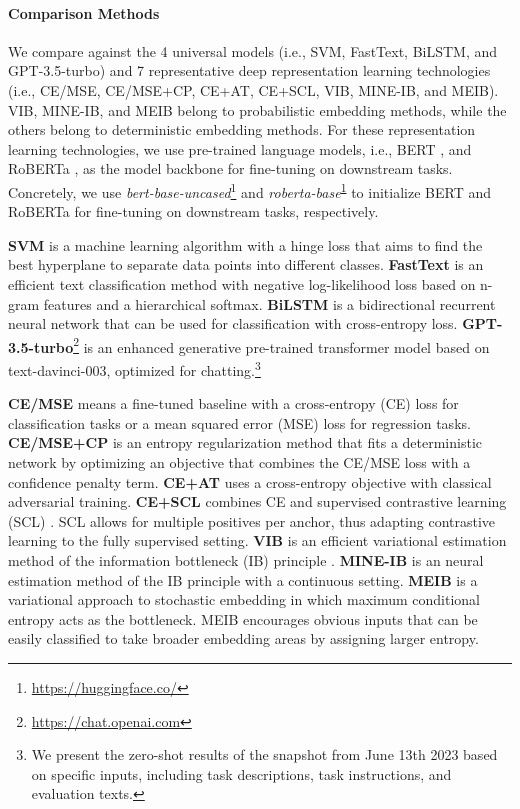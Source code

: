 \documentclass[letterpaper]{article} %
\begin{document}
\paragraph{Comparison Methods}
We compare against the 4 universal models (i.e., SVM, FastText, BiLSTM, and GPT-3.5-turbo) and 7 representative deep representation learning technologies (i.e., 
CE/MSE, CE/MSE+CP, CE+AT, CE+SCL, VIB, MINE-IB, and MEIB). 
VIB, MINE-IB, and MEIB belong to probabilistic embedding methods, while the others belong to deterministic embedding methods.
For these representation learning technologies, we use pre-trained language models, i.e., BERT \cite{DBLP:conf/naacl/DevlinCLT19}, and RoBERTa \cite{DBLP:journals/corr/abs-1907-11692}, as the model backbone for fine-tuning on downstream tasks.
Concretely, we use \textit{bert-base-uncased}\footnote{\url{https://huggingface.co/}\label{code}} and \textit{roberta-base}\textsuperscript{\ref{code}} to initialize BERT and RoBERTa for fine-tuning on downstream tasks, respectively.


\textbf{SVM} \cite{cortes1995support} is a machine learning algorithm with a hinge loss that aims to find the best hyperplane to separate data points into different classes.
\textbf{FastText} \cite{joulin2017bag} is an efficient text classification method with negative log-likelihood loss based on n-gram features and a hierarchical softmax.
\textbf{BiLSTM} is a bidirectional recurrent neural network \cite{hochreiter1997long} that can be used for classification with cross-entropy loss.
\textbf{GPT-3.5-turbo}\footnote{\url{https://chat.openai.com}} is an enhanced generative pre-trained transformer model based on text-davinci-003, optimized for chatting.\footnote{We present the zero-shot results of the snapshot from June 13th 2023 based on specific inputs, including task descriptions, task instructions, and evaluation texts.}


\textbf{CE/MSE} means a fine-tuned baseline with a cross-entropy (CE) loss for classification tasks or a mean squared error (MSE) loss for regression tasks.
\textbf{CE/MSE+CP} \cite{DBLP:conf/iclr/PereyraTCKH17} is an entropy regularization method that fits a deterministic network by optimizing an objective that combines the CE/MSE loss with a confidence penalty term. 
\textbf{CE+AT} \citep{DBLP:conf/iclr/MiyatoDG17} uses a cross-entropy objective with classical adversarial training.
\textbf{CE+SCL} \cite{gunel2020supervised} combines CE and supervised contrastive learning (SCL) \cite{khosla2020supervised}.
SCL allows for multiple positives per anchor, thus adapting contrastive learning to the fully supervised setting.
\textbf{VIB} \cite{DBLP:conf/iclr/AlemiFD017,DBLP:conf/iclr/MahabadiBH21}  is an efficient variational estimation method of the information bottleneck (IB) principle \cite{tishby2015deep}. 
\textbf{MINE-IB} \cite{DBLP:conf/icml/BelghaziBROBHC18}
is an neural estimation method of the IB principle with a continuous setting.
\textbf{MEIB}  
\cite{DBLP:conf/cvpr/AnJC23} is a variational approach to stochastic embedding in which maximum conditional entropy acts as the bottleneck.
MEIB encourages obvious inputs that can be easily classified to take broader embedding areas by assigning larger entropy.
\end{document}
